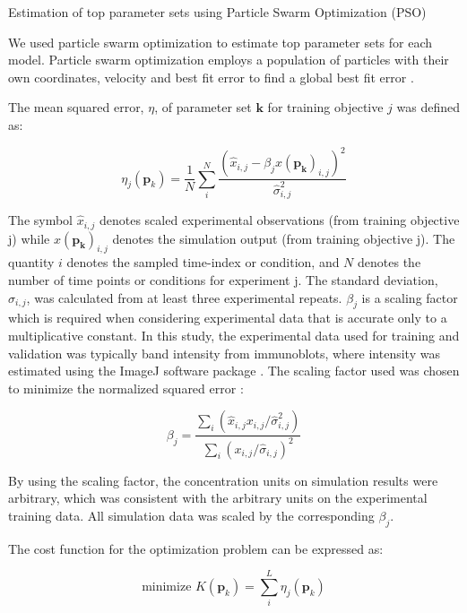 \documentclass[12pt]{article}
\makeatletter
\renewcommand\subsection{\@startsection
	{subsection}{2}{0mm}
	{-0.05in}
	{-0.5\baselineskip}
	{\normalfont\normalsize\bfseries}}
\makeatother
\begin{document}
\subsection{Estimation of top parameter sets using Particle Swarm Optimization (PSO)}

We used particle swarm optimization to estimate top parameter sets for each model. 
Particle swarm optimization employs a population of particles with their own coordinates, velocity and best fit error to find a global best fit error \cite{Eberhart1995}.  

The mean squared error, $\eta$, of parameter set $\mathbf{k}$ for training objective $j$ was defined as:    

\begin{equation}
\eta_j(\mathbf{p}_k) = \frac{1}{N}\sum_{i}^{N}\frac{(\hat{x}_{i,j} - \beta_j x(\mathbf{p_k})_{i,j})^2}{\hat{\sigma}^2_{i,j}}
\end{equation}

The symbol $\hat{x}_{i,j}$ denotes scaled experimental observations (from training objective j) while $x(\mathbf{p_k})_{i,j}$ denotes the simulation output (from training objective j). The quantity $i$ denotes the sampled time-index or condition, and $N$ denotes the number of time points or conditions for experiment j. The standard deviation, $\hat{\sigma}_{i,j}$, was calculated from at least three experimental repeats. $\beta_j$ is a scaling factor which is required when considering experimental data that is accurate only to a multiplicative constant. In this study, the experimental data used for training and validation was typically band intensity from immunoblots, where intensity was estimated using the ImageJ software package \cite{Abramoff2004}. The scaling factor used was chosen to minimize the normalized squared error \cite{Brown2003}:

\begin{equation}
\beta_j = \frac{\sum_{i}(\hat{x}_{i,j}x_{i,j}/\hat{\sigma}_{i,j}^2)}{\sum_{i}(x_{i,j}/\hat{\sigma}_{i,j})^2}
\end{equation} 

By using the scaling factor, the concentration units on simulation results were arbitrary, which was consistent with the arbitrary units on the experimental training data. All simulation data was scaled by the corresponding $\beta_j$. 

The cost function for the optimization problem can be expressed as: 

\begin{equation}
\text{minimize  }K(\mathbf{p}_k) = \sum_{i}^{L}\eta_j(\mathbf{p}_k)
\end{equation} 
\end{document}
